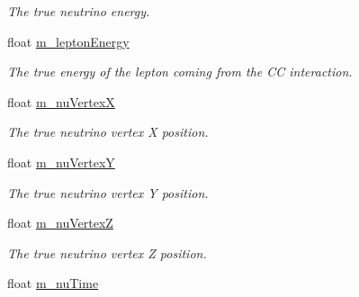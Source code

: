 \begin{DoxyCompactItemize}
\begin{DoxyCompactList}\small\item\em The true neutrino energy. \end{DoxyCompactList}\item 
\hypertarget{classflashmatch_1_1FlashMatchingTool_a9b34756c62ad017bee3da0c5d19330d9}{float \hyperlink{classflashmatch_1_1FlashMatchingTool_a9b34756c62ad017bee3da0c5d19330d9}{m\-\_\-lepton\-Energy}}\label{classflashmatch_1_1FlashMatchingTool_a9b34756c62ad017bee3da0c5d19330d9}

\begin{DoxyCompactList}\small\item\em The true energy of the lepton coming from the C\-C interaction. \end{DoxyCompactList}\item 
\hypertarget{classflashmatch_1_1FlashMatchingTool_abb21852617cec0a27cda3462a0a11bff}{float \hyperlink{classflashmatch_1_1FlashMatchingTool_abb21852617cec0a27cda3462a0a11bff}{m\-\_\-nu\-Vertex\-X}}\label{classflashmatch_1_1FlashMatchingTool_abb21852617cec0a27cda3462a0a11bff}

\begin{DoxyCompactList}\small\item\em The true neutrino vertex X position. \end{DoxyCompactList}\item 
\hypertarget{classflashmatch_1_1FlashMatchingTool_a356775f0a1f6304ac89ed0d53d671f51}{float \hyperlink{classflashmatch_1_1FlashMatchingTool_a356775f0a1f6304ac89ed0d53d671f51}{m\-\_\-nu\-Vertex\-Y}}\label{classflashmatch_1_1FlashMatchingTool_a356775f0a1f6304ac89ed0d53d671f51}

\begin{DoxyCompactList}\small\item\em The true neutrino vertex Y position. \end{DoxyCompactList}\item 
\hypertarget{classflashmatch_1_1FlashMatchingTool_a085ef14efb0bbfd5d6a2daa902f79c64}{float \hyperlink{classflashmatch_1_1FlashMatchingTool_a085ef14efb0bbfd5d6a2daa902f79c64}{m\-\_\-nu\-Vertex\-Z}}\label{classflashmatch_1_1FlashMatchingTool_a085ef14efb0bbfd5d6a2daa902f79c64}

\begin{DoxyCompactList}\small\item\em The true neutrino vertex Z position. \end{DoxyCompactList}\item 
\hypertarget{classflashmatch_1_1FlashMatchingTool_a6ea1d944847273ae6ce6f0ef5fd82497}{float \hyperlink{classflashmatch_1_1FlashMatchingTool_a6ea1d944847273ae6ce6f0ef5fd82497}{m\-\_\-nu\-Time}}\label{classflashmatch_1_1FlashMatchingTool_a6ea1d944847273ae6ce6f0ef5fd82497}


\end{DoxyCompactItemize}
